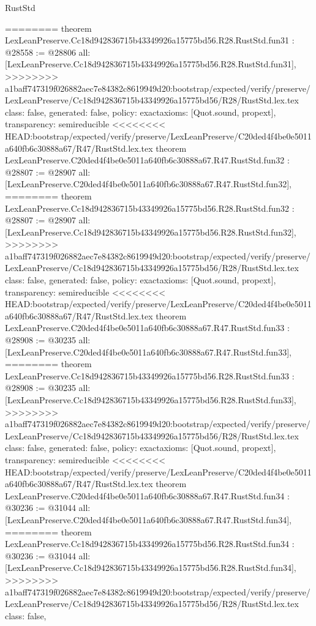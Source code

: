 \begin{lexlean}{RustStd}
\begin{coremodule}
{\begin{coremodule}
{{{{{{{{{{{{{{{{{{{{{{{{{{{{{{{{{{========
theorem LexLeanPreserve.Cc18d942836715b43349926a15775bd56.R28.RustStd.fun31 : @28558 := @28806 {
  all: [LexLeanPreserve.Cc18d942836715b43349926a15775bd56.R28.RustStd.fun31],
>>>>>>>> a1baff747319f026882aec7e84382c8619949d20:bootstrap/expected/verify/preserve/LexLeanPreserve/Cc18d942836715b43349926a15775bd56/R28/RustStd.lex.tex
  class: false,
  generated: false,
  policy: exact{axioms: [Quot.sound, propext]},
  transparency: semireducible
}
<<<<<<<< HEAD:bootstrap/expected/verify/preserve/LexLeanPreserve/C20ded4f4be0e5011a640fb6c30888a67/R47/RustStd.lex.tex
theorem LexLeanPreserve.C20ded4f4be0e5011a640fb6c30888a67.R47.RustStd.fun32 : @28807 := @28907 {
  all: [LexLeanPreserve.C20ded4f4be0e5011a640fb6c30888a67.R47.RustStd.fun32],
========
theorem LexLeanPreserve.Cc18d942836715b43349926a15775bd56.R28.RustStd.fun32 : @28807 := @28907 {
  all: [LexLeanPreserve.Cc18d942836715b43349926a15775bd56.R28.RustStd.fun32],
>>>>>>>> a1baff747319f026882aec7e84382c8619949d20:bootstrap/expected/verify/preserve/LexLeanPreserve/Cc18d942836715b43349926a15775bd56/R28/RustStd.lex.tex
  class: false,
  generated: false,
  policy: exact{axioms: [Quot.sound, propext]},
  transparency: semireducible
}
<<<<<<<< HEAD:bootstrap/expected/verify/preserve/LexLeanPreserve/C20ded4f4be0e5011a640fb6c30888a67/R47/RustStd.lex.tex
theorem LexLeanPreserve.C20ded4f4be0e5011a640fb6c30888a67.R47.RustStd.fun33 : @28908 := @30235 {
  all: [LexLeanPreserve.C20ded4f4be0e5011a640fb6c30888a67.R47.RustStd.fun33],
========
theorem LexLeanPreserve.Cc18d942836715b43349926a15775bd56.R28.RustStd.fun33 : @28908 := @30235 {
  all: [LexLeanPreserve.Cc18d942836715b43349926a15775bd56.R28.RustStd.fun33],
>>>>>>>> a1baff747319f026882aec7e84382c8619949d20:bootstrap/expected/verify/preserve/LexLeanPreserve/Cc18d942836715b43349926a15775bd56/R28/RustStd.lex.tex
  class: false,
  generated: false,
  policy: exact{axioms: [Quot.sound, propext]},
  transparency: semireducible
}
<<<<<<<< HEAD:bootstrap/expected/verify/preserve/LexLeanPreserve/C20ded4f4be0e5011a640fb6c30888a67/R47/RustStd.lex.tex
theorem LexLeanPreserve.C20ded4f4be0e5011a640fb6c30888a67.R47.RustStd.fun34 : @30236 := @31044 {
  all: [LexLeanPreserve.C20ded4f4be0e5011a640fb6c30888a67.R47.RustStd.fun34],
========
theorem LexLeanPreserve.Cc18d942836715b43349926a15775bd56.R28.RustStd.fun34 : @30236 := @31044 {
  all: [LexLeanPreserve.Cc18d942836715b43349926a15775bd56.R28.RustStd.fun34],
>>>>>>>> a1baff747319f026882aec7e84382c8619949d20:bootstrap/expected/verify/preserve/LexLeanPreserve/Cc18d942836715b43349926a15775bd56/R28/RustStd.lex.tex
  class: false,
}}}}}}}}}}}}}}}}}}}}}}}}}}}}}}}}}}}}}}
\end{coremodule}}
\end{coremodule}
\end{lexlean}
